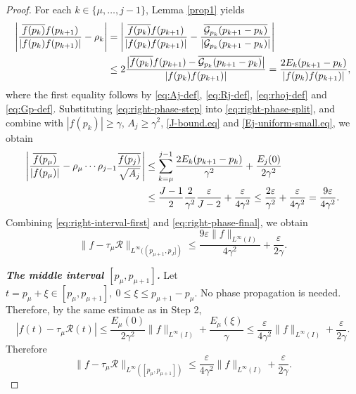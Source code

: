 \documentclass[11pt, reqno]{amsart}
\numberwithin{equation}{section}
\begin{document}
\begin{proof}
 
For each $k\in\{\mu,\dots,j-1\}$,  Lemma \ref{prop1} yields 
\begin{align}\label{eq:right-phase-step}%
\left| \frac{\overline{f(p_k)}f(p_{k+1})}{|f(p_k)f(p_{k+1})|} -\rho_k\right|
&= \left|\frac{\overline{f(p_k)}f(p_{k+1})}{|f(p_k)f(p_{k+1})|}-
\frac{\overline{\mathcal G_{p_k}(p_{k+1}-p_k)}}{|\mathcal G_{p_k}(p_{k+1}-p_k)|}\right| \notag\\
&\le2\frac{\bigl|\overline{f(p_k)}f(p_{k+1})-\overline{\mathcal G_{p_k}(p_{k+1}-p_k)}\bigr|}{|f(p_k)f(p_{k+1})|}
=\frac{2E_k(p_{k+1}-p_k)}{|f(p_k)f(p_{k+1})|},
\end{align}
where the first equality follows by  \eqref{eq:Aj-def}, \eqref{eq:Rj-def}, \eqref{eq:rhoj-def} and \eqref{eq:Gp-def}.  
Substituting \eqref{eq:right-phase-step} into \eqref{eq:right-phase-split}, and combine  with $|f(p_k)|\ge \gamma$, $
A_j\ge \gamma^2$, \eqref{J-bound.eq} and  \eqref{Ej-uniform-small.eq}, 
we obtain
\begin{align}\label{eq:right-phase-final}
\left| \frac{\overline{f(p_\mu)}}{|f(p_\mu)|} - \rho_\mu\cdots\rho_{j-1}\frac{\overline{f(p_j)}}{\sqrt{A_j}}\right|
&\le \sum_{k=\mu}^{j-1}\frac{2E_k(p_{k+1}-p_k)}{\gamma^2} + \frac{E_j(0)}{2\gamma^2} \notag\\
& \le \frac{J-1}{2} \frac{2}{\gamma^2} \frac{\varepsilon}{J-2}  + \frac{\varepsilon}{4 \gamma^2} \le  \frac{2\varepsilon}{\gamma^2} + \frac{\varepsilon}{4 \gamma^2}  =  \frac{9\varepsilon}{4 \gamma^2} . 
\end{align}
Combining \eqref{eq:right-interval-first} and \eqref{eq:right-phase-final}, we obtain
\begin{equation}\label{eq:right-interval-final}
\|f-\tau_\mu\mathcal R\|_{L^\infty((p_{\mu+1},p_J])} \le
\frac{9\varepsilon\|f\|_{L^\infty(I)}}{4\gamma^2} + \frac{\varepsilon}{2\gamma}.
\end{equation}


\medskip
\noindent
\emph{\textbf{The middle interval $[p_\mu,p_{\mu+1}]$.}}  
Let $ t=p_\mu+\xi\in[p_\mu,p_{\mu+1}], \ 
0\le \xi\le p_{\mu+1}-p_\mu$. 
No phase propagation is needed. Therefore, by the same estimate as in Step 2,
$$ |f(t)-\tau_\mu\mathcal R(t)| \le \frac{E_\mu(0)}{2\gamma^2}\|f\|_{L^\infty(I)}
+ \frac{E_\mu(\xi)}{\gamma}
\le \frac{\varepsilon}{4\gamma^2}\|f\|_{L^\infty(I)} + \frac{\varepsilon}{2\gamma}.$$ 
Therefore 
\begin{equation}\label{eq:middle-interval-final}
\|f-\tau_\mu\mathcal R\|_{L^\infty([p_\mu,p_{\mu+1}])}
\le\frac{ \varepsilon}{4 \gamma^2} \|f\|_{L^{\infty} (I)} + \frac{ \varepsilon}{2\gamma}.
\end{equation}


\end{proof}
\end{document}
